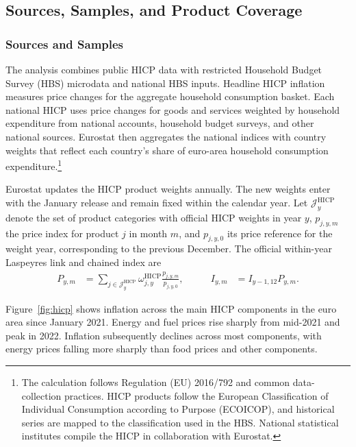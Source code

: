 \documentclass[11pt]{article}
\begin{document}
\subsection{Sources, Samples, and Product Coverage}

\subsubsection*{Sources and Samples}

The analysis combines public HICP data with restricted Household Budget Survey (HBS) microdata and
national HBS inputs. Headline HICP inflation measures price changes for the aggregate household
consumption basket. Each national HICP uses price changes for goods and services weighted by
household expenditure from national accounts, household budget surveys, and other national sources.
Eurostat then aggregates the national indices with country weights that reflect each country's share
of euro-area household consumption expenditure.\footnote{The calculation follows Regulation (EU)
2016/792 and common data-collection practices. HICP products follow the European Classification of
Individual Consumption according to Purpose (ECOICOP), and historical series are mapped to the
classification used in the HBS. National statistical institutes compile the HICP in collaboration
with Eurostat.}

Eurostat updates the HICP product weights annually. The new weights enter with the January release
and remain fixed within the calendar year. Let $\mathcal J_y^{\mathrm{HICP}}$ denote the set of product categories
with official HICP weights in year $y$, $p_{j,y,m}$ the price index for product $j$ in month $m$, and
$p_{j,y,0}$ its price reference for the weight year, corresponding to the previous December. The
official within-year Laspeyres link and chained index are
\begin{equation}
\begin{aligned}
P_{y,m}
&=\sum_{j\in\mathcal J_y^{\mathrm{HICP}}}\omega^{\mathrm{HICP}}_{j,y}
\frac{p_{j,y,m}}{p_{j,y,0}},
&\qquad I_{y,m}&=I_{y-1,12}P_{y,m}.
\end{aligned}
\end{equation}

Figure~\ref{fig:hicp} shows inflation across the main HICP components in the euro area since January
2021. Energy and fuel prices rise sharply from mid-2021 and peak in 2022. Inflation subsequently
declines across most components, with energy prices falling more sharply than food prices and other
components.
\end{document}
